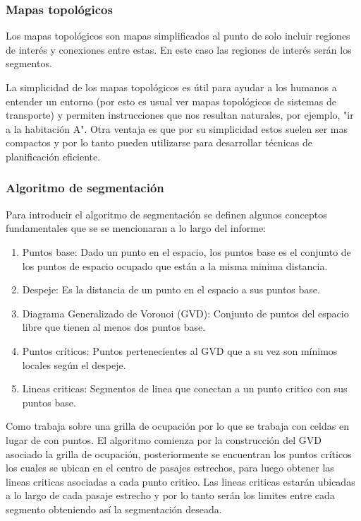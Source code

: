 \subsubsection{Mapas topológicos}
Los mapas topológicos son mapas simplificados al punto de solo incluir regiones de interés y conexiones entre estas. En este caso las regiones de interés serán los segmentos. 

La simplicidad de los mapas topológicos es útil para ayudar a los humanos a entender un entorno (por esto es usual ver mapas topológicos de sistemas de transporte) y permiten instrucciones que nos resultan naturales, por ejemplo, "ir a la habitación A". Otra ventaja es que por su simplicidad estos suelen ser mas compactos y por lo tanto pueden utilizarse para desarrollar técnicas de planificación eficiente.

\subsubsection{Algoritmo de segmentación}
Para introducir el algoritmo de segmentación se definen algunos conceptos fundamentales que se se mencionaran a lo largo del informe:
\begin{enumerate}
  \item Puntos base: Dado un punto en el espacio, los puntos base es el conjunto de los puntos de espacio ocupado que están a la misma minima distancia.
  \item Despeje: Es la distancia de un punto en el espacio a sus puntos base.
  \item Diagrama Generalizado de Voronoi (GVD): Conjunto de puntos del espacio libre que tienen al menos dos puntos base.
  \item Puntos críticos: Puntos pertenecientes al GVD que a su vez son mínimos locales según el despeje.
  \item Lineas criticas: Segmentos de linea que conectan a un punto critico con sus puntos base.
\end{enumerate}

Como trabaja sobre una grilla de ocupación por lo que se trabaja con celdas en lugar de con puntos. El algoritmo comienza por la construcción del GVD asociado la grilla de ocupación, posteriormente se encuentran los puntos críticos los cuales se ubican en el centro de pasajes estrechos, para luego obtener las lineas criticas asociadas a cada punto critico. Las lineas criticas estarán ubicadas a lo largo de cada pasaje estrecho y por lo tanto serán los limites entre cada segmento obteniendo así la segmentación deseada.

